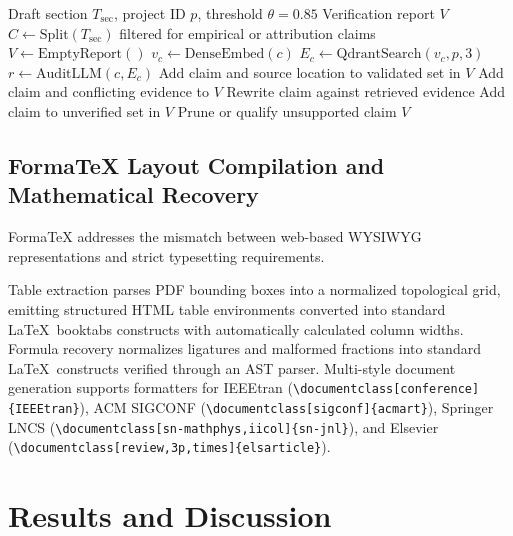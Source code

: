 \documentclass[conference]{IEEEtran}
\begin{document}
\begin{algorithm}[!t]
\caption{Real-Time Claim Extraction and Multi-Hop Grounding}
\label{alg:fact}
\begin{algorithmic}[1]
\Require Draft section $T_{\mathrm{sec}}$, project ID $p$, threshold $\theta = 0.85$
\Ensure Verification report $V$
\State $C \gets \mathrm{Split}(T_{\mathrm{sec}})$ filtered for empirical or attribution claims
\State $V \gets \mathrm{EmptyReport}()$
  \State $v_c \gets \mathrm{DenseEmbed}(c)$
  \State $E_c \gets \mathrm{QdrantSearch}(v_c, p, 3)$
  \State $r \gets \mathrm{AuditLLM}(c, E_c)$
    \State Add claim and source location to validated set in $V$
    \State Add claim and conflicting evidence to $V$
    \State Rewrite claim against retrieved evidence
  \Else
    \State Add claim to unverified set in $V$
    \State Prune or qualify unsupported claim
  \EndIf
\EndFor
\State \Return $V$
\end{algorithmic}
\end{algorithm}

\subsection{FormaTeX Layout Compilation and Mathematical Recovery}
FormaTeX addresses the mismatch between web-based WYSIWYG representations and strict typesetting requirements.

 Table extraction parses PDF bounding boxes into a normalized topological grid, emitting structured HTML table environments converted into standard \LaTeX\ booktabs constructs with automatically calculated column widths. Formula recovery normalizes ligatures and malformed fractions into standard \LaTeX\ constructs verified through an AST parser. Multi-style document generation supports formatters for IEEEtran (\verb|\documentclass[conference]{IEEEtran}|), ACM SIGCONF (\verb|\documentclass[sigconf]{acmart}|), Springer LNCS (\verb|\documentclass[sn-mathphys,iicol]{sn-jnl}|), and Elsevier (\verb|\documentclass[review,3p,times]{elsarticle}|).

\section{Results and Discussion}
\end{document}

